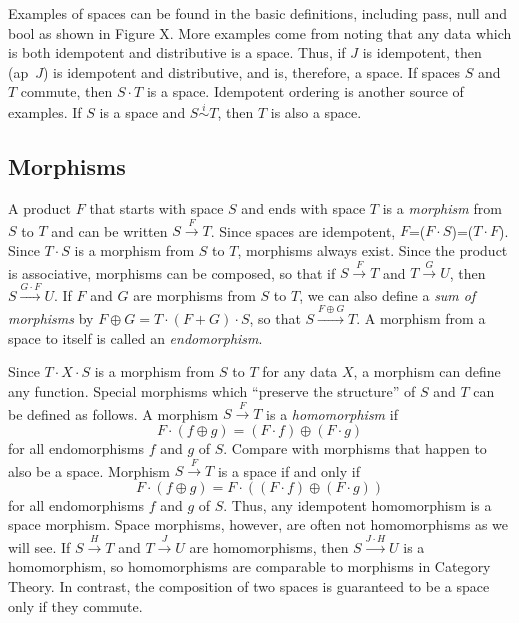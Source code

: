 \documentclass[11pt]{article}
\begin{document}
Examples of spaces can be found in the basic definitions, including pass, null and bool as shown in Figure X.  More examples come from 
noting that any data which is both idempotent and distributive is a space.  Thus, if $J$ is idempotent, then (ap\ $J$) is idempotent and 
distributive, and is, therefore, a space.  If spaces $S$ and $T$ commute, then $S\cdot T$ is a space.  Idempotent ordering is another 
source of examples.  If $S$ is a space and $S{\overset i\sim}T$, then $T$ is also a space.  

\subsection{Morphisms} 

A product $F$ that starts with space $S$ and ends with space $T$ is a {\it morphism} from $S$ to $T$ and can be written $S{\overset F\longrightarrow}T$.
Since spaces are idempotent, $F$=($F\cdot S$)=($T\cdot F$).  Since $T\cdot S$ is a morphism from $S$ to $T$, morphisms always exist.  
Since the product is associative, morphisms can be composed, so that if $S{\overset F\longrightarrow}T$ and 
$T{\overset G\longrightarrow}U$, then $S{\overset {G\cdot F}\longrightarrow}U$.  
If $F$ and $G$ are morphisms from $S$ to $T$, we can also define a {\it sum of morphisms} by $F \oplus G = T\cdot (F+G)\cdot S$, so that 
$S{\overset {F\oplus G}\longrightarrow}T$.  A morphism from a space to itself is called an {\it endomorphism}. 

    Since $T\cdot X\cdot S$ is a morphism from $S$ to $T$ for any data $X$, a morphism can define any function.  Special morphisms which 
``preserve the structure'' of $S$ and $T$ can be defined as follows.  A morphism $S{\overset F\longrightarrow}T$ is a {\it homomorphism} if 
\begin{equation}
F\cdot (f\oplus g) = (F\cdot f) \oplus (F\cdot g) 
\end{equation}
for all endomorphisms $f$ and $g$ of $S$.  Compare with morphisms that happen to also be a space.  Morphism $S{\overset F\longrightarrow}T$ is a space if and only if 
\begin{equation}
F\cdot (f\oplus g) = F\cdot ((F\cdot f) \oplus (F\cdot g)) 
\end{equation}
for all endomorphisms $f$ and $g$ of $S$.  Thus, any idempotent homomorphism is a space morphism.  Space morphisms, however, are often not homomorphisms 
as we will see.  If $S{\overset H\longrightarrow}T$ and $T{\overset J\longrightarrow}U$ 
are homomorphisms, then $S{\overset {J\cdot H} \longrightarrow}U$ is a homomorphism, so homomorphisms are comparable to morphisms in Category Theory.  
In contrast, the composition of two spaces is guaranteed to be a space only if they commute. 
\end{document}
